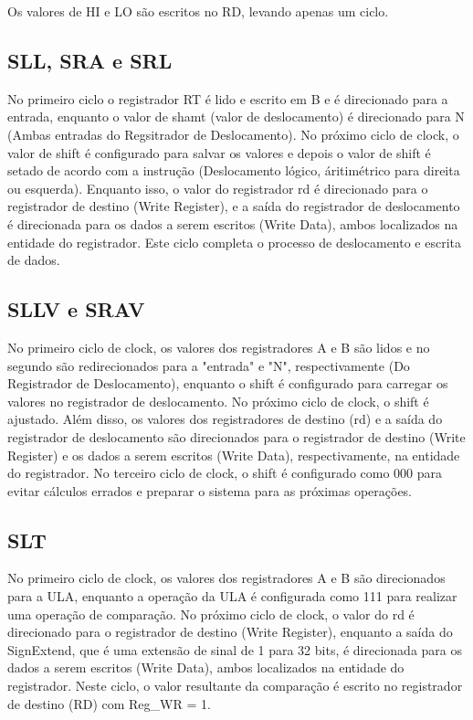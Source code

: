 Os valores de HI e LO são escritos no RD, levando apenas um ciclo.

\subsection{SLL, SRA e SRL}

No primeiro ciclo o registrador RT é lido e escrito em B e é direcionado para a entrada, enquanto o valor de shamt (valor de deslocamento) é direcionado para N (Ambas entradas do Regsitrador de Deslocamento). No próximo ciclo de clock, o valor de shift é configurado para salvar os valores e depois o valor de shift é setado de acordo com a instrução (Deslocamento lógico, áritimétrico para direita ou esquerda). Enquanto isso, o valor do registrador rd é direcionado para o registrador de destino (Write Register), e a saída do registrador de deslocamento é direcionada para os dados a serem escritos (Write Data), ambos localizados na entidade do registrador. Este ciclo completa o processo de deslocamento e escrita de dados.

\subsection{SLLV e SRAV}

No primeiro ciclo de clock, os valores dos registradores A e B são lidos e no segundo são redirecionados para a "entrada" e "N", respectivamente (Do Registrador de Deslocamento), enquanto o shift é configurado para carregar os valores no registrador de deslocamento. No próximo ciclo de clock, o shift é ajustado. Além disso, os valores dos registradores de destino (rd) e a saída do registrador de deslocamento são direcionados para o registrador de destino (Write Register) e os dados a serem escritos (Write Data), respectivamente, na entidade do registrador. No terceiro ciclo de clock, o shift é configurado como 000 para evitar cálculos errados e preparar o sistema para as próximas operações.

\subsection{SLT}

No primeiro ciclo de clock, os valores dos registradores A e B são direcionados para a ULA, enquanto a operação da ULA é configurada como 111 para realizar uma operação de comparação. No próximo ciclo de clock, o valor do rd é direcionado para o registrador de destino (Write Register), enquanto a saída do SignExtend, que é uma extensão de sinal de 1 para 32 bits, é direcionada para os dados a serem escritos (Write Data), ambos localizados na entidade do registrador. Neste ciclo, o valor resultante da comparação é escrito no registrador de destino (RD) com Reg\_WR = 1.

